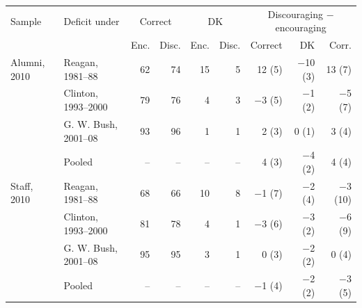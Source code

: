 \begin{tabular}{llrrrrrrr}
\toprule
Sample & Deficit under & \multicolumn{2}{c}{Correct} & \multicolumn{2}{c}{DK} & \multicolumn{3}{c}{Discouraging $-$ encouraging}\\ & & Enc. & Disc. & Enc. & Disc. & Correct & DK & Corr. \\
\midrule
Alumni, 2010 & Reagan, 1981--88 & 62 & 74 & 15 & 5 & 12 (5) & $-$10 (3) & 13 (7) \\
 & Clinton, 1993--2000 & 79 & 76 & 4 & 3 & $-$3 (5) & $-$1 (2) & $-$5 (7) \\
 & G. W. Bush, 2001--08 & 93 & 96 & 1 & 1 & 2 (3) & 0 (1) & 3 (4) \\
 & Pooled & -- & -- & -- & -- & 4 (3) & $-$4 (2) & 4 (4) \\
Staff, 2010 & Reagan, 1981--88 & 68 & 66 & 10 & 8 & $-$1 (7) & $-$2 (4) & $-$3 (10) \\
 & Clinton, 1993--2000 & 81 & 78 & 4 & 1 & $-$3 (6) & $-$3 (2) & $-$6 (9) \\
 & G. W. Bush, 2001--08 & 95 & 95 & 3 & 1 & 0 (3) & $-$2 (2) & 0 (4) \\
 & Pooled & -- & -- & -- & -- & $-$1 (4) & $-$2 (2) & $-$3 (5) \\
\bottomrule
\end{tabular}
